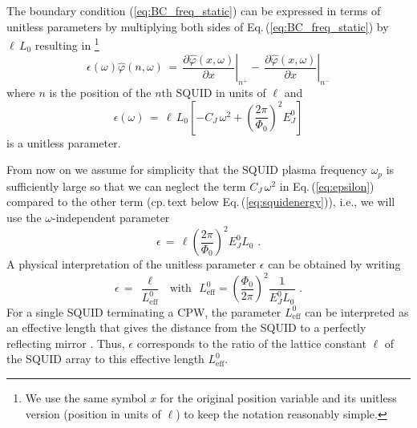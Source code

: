 %
The boundary condition (\ref{eq:BC_freq_static}) can be expressed in terms of unitless parameters
by multiplying both sides of Eq.\,(\ref{eq:BC_freq_static}) by $\ell \, L_0$ resulting in
\footnote{We use the same symbol $x$ for the original position variable and its 
unitless version (position in units of $\ell$) to keep the notation reasonably simple.}
%
\begin{equation}\label{eq:BC_freq_static_unitless}
\epsilon(\omega) \hat{\varphi}(n, \omega) \, = \, 
\left.\frac{\partial \hat{\varphi}(x, \omega)}{\partial x}\right|_{n^{+}}
- \, \left.\frac{\partial \hat{\varphi}(x,\omega)}{\partial x}\right|_{n^{-}}
\end{equation}
%
where $n$ is the position of the $n$th SQUID in units of $\ell$ and 
%
\begin{equation} \label{eq:epsilon}
\epsilon(\omega) \, = \, \ell \, L_0 \left[ - C_{J} \, \omega^2 + 
\left(\frac{2 \pi}{\Phi_{0}}\right)^{2} E_J^0 \right] 
\end{equation}
%
is a unitless parameter.

From now on we assume for simplicity that the SQUID plasma frequency $\omega_p$ is sufficiently 
large so that we can neglect the term $C_{J} \, \omega^2$ in Eq.\,(\ref{eq:epsilon}) compared to 
the other term \cite{Johansson2010}
(cp.\,text below Eq.\,(\ref{eq:squidenergy})), i.e., we will use the $\omega$-independent parameter
%
\begin{equation} \label{eq:epsilon2}
\epsilon \, = \, \ell \left(\frac{2 \pi}{\Phi_{0}}\right)^{2} E_J^0 L_0 \, \, .
\end{equation}
%
A physical interpretation of the unitless parameter $\epsilon$ can be obtained by writing
%
\begin{equation} \label{eq:epsilon_ip}
\epsilon \, = \, \frac{\ell}{L_{\text{eff}}^0} \, \, \, \, \text{with} 
\, \, \, \, L_{\text{eff}}^0 = \left(\frac{\Phi_0}{2 \pi}\right)^{2} \frac{1}{E_J^0 L_0} \, \, .
\end{equation}
%
For a single SQUID terminating a CPW, the parameter $L_{\text{eff}}^0$ can be interpreted
as an effective length that gives the distance from the SQUID to a perfectly reflecting mirror 
\cite{Johansson2010}. Thus, $\epsilon$ corresponds to the ratio of the lattice constant $\ell$
of the SQUID array to this effective length $L_{\text{eff}}^0$. 



